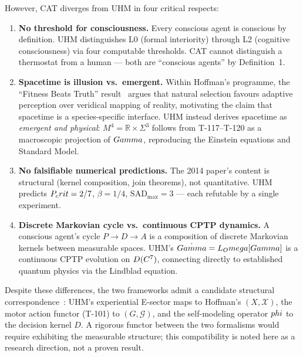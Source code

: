 However, CAT diverges from UHM in four critical respects:
\begin{enumerate}[leftmargin=2em]
  \item \textbf{No threshold for consciousness.} Every conscious agent is
        conscious by definition. UHM distinguishes L0 (formal interiority)
        through L2 (cognitive consciousness) via four computable thresholds.
        CAT cannot distinguish a thermostat from a human --- both are
        ``conscious agents'' by Definition~1.
  \item \textbf{Spacetime is illusion vs.\ emergent.} Within Hoffman's
        programme, the ``Fitness Beats Truth'' result~\cite{prakash2021fbt}
        argues that natural selection favours adaptive perception over
        veridical mapping of reality, motivating the claim that spacetime is
        a species-specific interface. UHM instead derives spacetime as
        \emph{emergent and physical}: $M^4 = \mathbb{R} \times \Sigma^3$
        follows from T-117--T-120 as a macroscopic projection of $Gamma$,
        reproducing the Einstein equations and Standard Model.
  \item \textbf{No falsifiable numerical predictions.} The 2014 paper's
        content is structural (kernel composition, join theorems), not
        quantitative. UHM predicts $P_crit = 2/7$, $\beta = 1/4$,
        $\mathrm{SAD}_{\max} = 3$ --- each refutable by a single experiment.
  \item \textbf{Discrete Markovian cycle vs.\ continuous CPTP dynamics.} A
        conscious agent's cycle $P \to D \to A$ is a composition of discrete
        Markovian kernels between measurable spaces. UHM's
        $\dot{Gamma} = L_Omega[Gamma]$ is a continuous CPTP evolution on
        $D(C^7)$, connecting directly to established quantum
        physics via the Lindblad equation.
\end{enumerate}

\noindent
Despite these differences, the two frameworks admit a candidate structural
correspondence~: UHM's experiential E-sector maps to Hoffman's
$(X, \mathcal{X})$, the motor action functor (T-101) to $(G, \mathcal{G})$,
and the self-modeling operator $phi$ to the decision kernel $D$. A rigorous
functor between the two formalisms would require exhibiting the measurable
structure; this compatibility is noted here as a research direction, not a
proven result.

